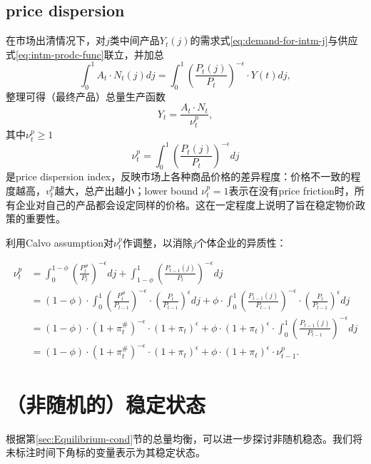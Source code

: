 \subsection{price dispersion}
在市场出清情况下，对$j$类中间产品$Y_t(j)$的需求式\eqref{eq:demand-for-intm-j}与供应式\eqref{eq:intm-prodc-func}联立，并加总
\begin{equation*}
  \int_{0}^1 A_t \cdot N_t(j) dj= \int_0^1 \left(\frac{P_{t}(j)}{P_t}\right)^{-\epsilon} \cdot Y(t) dj,
\end{equation*}
整理可得（最终产品）总量生产函数
\begin{equation}
  \label{eq:equili-agg-j-prod-DS}
  Y_t = \frac{A_t \cdot N_t}{\nu^p_t},
\end{equation}
其中$\nu^p_t \ge 1$
\begin{equation}
  \label{eq:price-dispersion-index}
  \nu^p_t = \int_0^1 \left(\frac{P_t(j)}{P_t}\right)^{-\epsilon} dj
\end{equation}
是price dispersion index，反映市场上各种商品价格的差异程度：价格不一致的程度越高，$v_t^p$越大，总产出越小；lower bound $\nu_t^p=1$表示在没有price friction时，所有企业对自己的产品都会设定同样的价格。这在一定程度上说明了旨在稳定物价政策的重要性。

利用Calvo assumption对$\nu^p_t$作调整，以消除$j$个体企业的异质性：

\begin{align}
\label{eq:price-dispersion-index-noj}
  \nu^p_t &= \int_{0}^{1-\phi} \left(\frac{P_t^{\#}}{P_t}\right)^{-\epsilon} dj + \int_{1-\phi}^1 \left(\frac{P_{t-1}(j)}{P_t}\right)^{-\epsilon} dj\nonumber\\
                   &= (1-\phi) \cdot \int_{0}^{1} \left(\frac{P_t^{\#}}{P_{t-1}}\right)^{-\epsilon}
\cdot \left(\frac{P_t}{P_{t-1}}\right)^{\epsilon} dj + \phi \cdot \int_{0}^{1} \left(\frac{P_{t-1}(j)}{P_{t-1}}\right)^{-\epsilon} \cdot \left(\frac{P_t}{P_{t-1}}\right)^{\epsilon} dj\nonumber\\
                   &= (1-\phi) \cdot (1+\pi^{\#}_t)^{-\epsilon} \cdot (1+\pi_t)^{\epsilon} + \phi \cdot (1+\pi_t)^{\epsilon} \cdot \int_{0}^1 \left(\frac{P_{t-1}(j)}{P_{t-1}}\right)^{-\epsilon} dj \nonumber\\
                   &=(1-\phi) \cdot (1+\pi^{\#}_t)^{-\epsilon} \cdot (1+\pi_t)^{\epsilon} + \phi \cdot (1+\pi_t)^{\epsilon} \cdot \nu^p_{t-1}.
\end{align}

\section{（非随机的）稳定状态}
\label{sec:BNK-steady-state}
根据第\ref{sec:Equilibrium-cond}节的总量均衡，可以进一步探讨非随机稳态。我们将未标注时间下角标的变量表示为其稳定状态。


